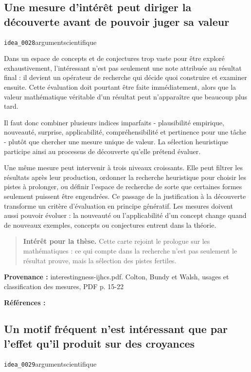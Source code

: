 \documentclass[10pt,a4paper]{article}
\begin{document}
\subsection{Une mesure d'intérêt peut diriger la découverte avant de pouvoir juger sa valeur}
{\small\color{metadata} \texttt{idea\_0028}\quad\textbullet\quad argument\quad\textbullet\quad scientifique\par}

Dans un espace de concepts et de conjectures trop vaste pour être exploré exhaustivement, l'intéressant n'est pas seulement une note attribuée au résultat final : il devient un opérateur de recherche qui décide quoi construire et examiner ensuite. Cette évaluation doit pourtant être faite immédiatement, alors que la valeur mathématique véritable d'un résultat peut n'apparaître que beaucoup plus tard.

Il faut donc combiner plusieurs indices imparfaits - plausibilité empirique, nouveauté, surprise, applicabilité, compréhensibilité et pertinence pour une tâche - plutôt que chercher une mesure unique de valeur. La sélection heuristique participe ainsi au processus de découverte qu'elle prétend évaluer.

Une même mesure peut intervenir à trois niveaux croissants. Elle peut filtrer les résultats après leur production, ordonner la recherche heuristique pour choisir les pistes à prolonger, ou définir l'espace de recherche de sorte que certaines formes seulement puissent être engendrées. Ce passage de la justification à la découverte transforme un critère d'évaluation en principe génératif. Les mesures doivent aussi pouvoir évoluer : la nouveauté ou l'applicabilité d'un concept change quand de nouveaux exemples, concepts ou conjectures entrent dans la théorie.

\begin{quote}
\textbf{Intérêt pour la thèse.} Cette carte rejoint le prologue sur les mathématiques : ce qui compte dans la recherche n'est pas seulement le résultat prouve, mais la sélection des pistes fertiles.
\end{quote}
{\footnotesize\color{metadata}\textbf{Provenance :} interestingness-ijhcs.pdf. Colton, Bundy et Walsh, usages et classification des mesures, PDF p. 15-22\par}
{\footnotesize\color{metadata}\textbf{Références :} \parencite{colton2000interestingness}\par}

\subsection{Un motif fréquent n'est intéressant que par l'effet qu'il produit sur des croyances}
{\small\color{metadata} \texttt{idea\_0029}\quad\textbullet\quad argument\quad\textbullet\quad scientifique\par}
\end{document}
